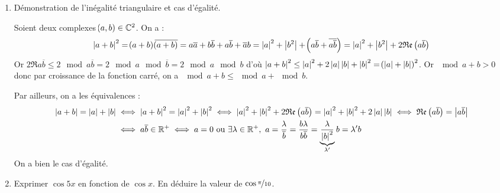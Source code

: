 \documentclass[a4paper,french,bookmarks]{book}
\begin{document}
    \begin{enumerate}
        \item Démonstration de l'inégalité triangulaire et cas d'égalité.
        
        \noafter
        \nobefore
        \yesafter
        \begin{nproof}
            Soient deux complexes $\!\left(a, b\right) \in \mathbb{C}^2$. On a :
            \[ \mod{a + b}^2 = \p{a + b}\overline{\p{a + b}} = a\overline{a} + b\overline{b} + a\overline{b} + \overline{a}b = \mod{a}^2 + \mod{b^2} + \p{a\overline{b} + \overline{a\overline{b}}} = \mod{a}^2 + \mod{b^2} + 2\Re{a\overline{b}}\]
            Or $2\Re{a\overline{b}} \leq 2\mod{a\overline{b}} = 2\mod{a}\mod{\overline{b}} = 2\mod{a}\mod{b}$ d'où $\left\lvert a + b\right\rvert^2 \leq \left\lvert a\right\rvert^2 + 2\left\lvert a\right\rvert\left\lvert b\right\rvert + \left\lvert b\right\rvert^2 = \!\left(\left\lvert a\right\rvert + \left\lvert b\right\rvert\right)^2$. Or $\mod{a + b} > 0$ donc par croissance de la fonction carré, on a $\mod{a + b} \leq \mod{a} + \mod{b}$.
            
            Par ailleurs, on a les équivalences :
            \begin{align*}
                \mod{a + b} = \mod{a} + \mod{b} &\iff \mod{a + b}^2 = \mod{a}^2 + \mod{b}^2 \iff \mod{a}^2 + \mod{b}^2 + 2\Re{a\overline{b}} = \mod{a}^2 + \mod{b}^2 + 2\mod{a}\mod{b} \iff \Re{a\overline{b}} = \mod{a\overline{b}}\\
                &\iff a\overline{b} \in \bdR^+ \iff a = 0 \ou \exists \lambda \in \bdR^+, \ a = \dfrac{\lambda}{\overline{b}} = \dfrac{b\lambda}{b\overline{b}} = \underbrace{\dfrac{\lambda}{\mod{b}^2}}_{\lambda'}b = \lambda'b
            \end{align*}
            On a bien le cas d'égalité.
        \end{nproof}
        \yesbefore
        
        \item Exprimer $\cos{5x}$ en fonction de $\cos x$. En déduire la valeur de $\cos{\nicefrac{\pi}{10}}$.
        

\end{enumerate}
\end{document}
